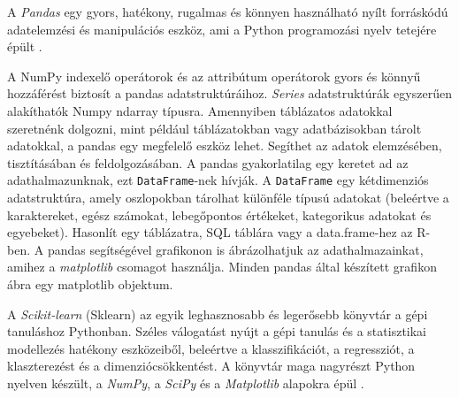 
A \textit{Pandas} egy gyors, hatékony, rugalmas és könnyen használható nyílt forráskódú adatelemzési és manipulációs eszköz, ami a Python programozási nyelv tetejére épült \cite{mckinney2011pandas}.

A NumPy indexelő operátorok és az attribútum operátorok gyors és könnyű hozzáférést biztosít a pandas adatstruktúráihoz. \textit{Series} adatstruktúrák egyszerűen alakíthatók Numpy ndarray típusra.
Amennyiben táblázatos adatokkal szeretnénk dolgozni, mint például táblázatokban vagy adatbázisokban tárolt adatokkal, a pandas egy megfelelő eszköz lehet. Segíthet az adatok elemzésében, tisztításában és feldolgozásában. A pandas gyakorlatilag egy keretet ad az adathalmazunknak, ezt \texttt{DataFrame}-nek hívják. A \texttt{DataFrame} egy kétdimenziós adatstruktúra, amely oszlopokban tárolhat különféle típusú adatokat (beleértve a karaktereket, egész számokat, lebegőpontos értékeket, kategorikus adatokat és egyebeket). Hasonlít egy táblázatra, SQL táblára vagy a data.frame-hez az R-ben.
A pandas segítségével grafikonon is ábrázolhatjuk az adathalmazainkat, amihez a \textit{matplotlib} csomagot használja. Minden pandas által készített grafikon ábra egy matplotlib objektum.



A \textit{Scikit-learn} (Sklearn) az egyik leghasznosabb és legerősebb könyvtár a gépi tanuláshoz Pythonban. Széles válogatást nyújt a gépi tanulás és a statisztikai modellezés hatékony eszközeiből, beleértve a klasszifikációt, a regressziót, a klaszterezést és a dimenziócsökkentést. A könyvtár maga nagyrészt Python nyelven készült, a \textit{NumPy}, a \textit{SciPy} és a \textit{Matplotlib} alapokra épül \cite{pedregosa2011scikit}.
